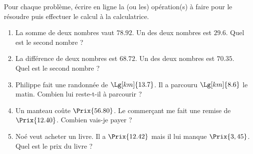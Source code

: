 \begin{exercice*}
    Pour chaque problème, écrire en ligne la (ou les) opération(s) à faire pour le résoudre puis effectuer le calcul à la calculatrice.
    \begin{enumerate}
       \item La somme de deux nombres vaut $\num{78.92}$. Un des deux nombres est $\num{29.6}$. Quel est le second nombre ?
       \item La différence de deux nombres est $\num{68.72}$. Un des deux nombres est $\num{70.35}$. Quel est le second nombre ?
       \item Philippe fait une randonnée de $\Lg[km]{13.7}$. Il a parcouru $\Lg[km]{8.6}$ le matin.
        Combien lui reste-t-il à parcourir ?
       \item Un manteau coûte $\Prix{56.80}$. Le commerçant me fait une remise de $\Prix{12.40}$. Combien vais-je payer ?
       \item Noé veut acheter un livre. Il a $\Prix{12.42}$ mais il lui manque $\Prix{3,45}$. Quel est le prix du livre ?   
    \end{enumerate}
\end{exercice*}
